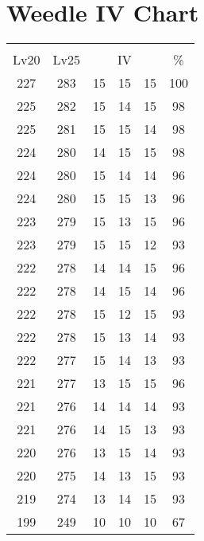 \documentclass{article}%
\begin{document}
%
\normalsize%
\section{Weedle IV Chart}%
\label{sec:Weedle IV Chart}%
\renewcommand{\arraystretch}{1.5}%
\begin{tabular}{|c|c|c|c|c|c|}%
\hline%
\multicolumn{6}{|c|}{\textcolor{white}{ 
\linebreak{Weedle}
}%
\cellcolor{black}}\\%
\multicolumn{1}{|c}{Lv20}&\multicolumn{1}{c|}{Lv25}&\multicolumn{3}{c|}{IV}&\multicolumn{1}{|c|}{\%}\\%
\hline%
\rowcolor{color100}%
227&283&15&15&15&100\\%
\hline%
\rowcolor{color98}%
225&282&15&14&15&98\\%
\hline%
\rowcolor{color98}%
225&281&15&15&14&98\\%
\hline%
\rowcolor{color98}%
224&280&14&15&15&98\\%
\hline%
\rowcolor{color96}%
224&280&15&14&14&96\\%
\hline%
\rowcolor{color96}%
224&280&15&15&13&96\\%
\hline%
\rowcolor{color96}%
223&279&15&13&15&96\\%
\hline%
\rowcolor{color93}%
223&279&15&15&12&93\\%
\hline%
\rowcolor{color96}%
222&278&14&14&15&96\\%
\hline%
\rowcolor{color96}%
222&278&14&15&14&96\\%
\hline%
\rowcolor{color93}%
222&278&15&12&15&93\\%
\hline%
\rowcolor{color93}%
222&278&15&13&14&93\\%
\hline%
\rowcolor{color93}%
222&277&15&14&13&93\\%
\hline%
\rowcolor{color96}%
221&277&13&15&15&96\\%
\hline%
\rowcolor{color93}%
221&276&14&14&14&93\\%
\hline%
\rowcolor{color93}%
221&276&14&15&13&93\\%
\hline%
\rowcolor{color93}%
220&276&13&15&14&93\\%
\hline%
\rowcolor{color93}%
220&275&14&13&15&93\\%
\hline%
\rowcolor{color93}%
219&274&13&14&15&93\\%
\hline%
\rowcolor{color91}%
199&249&10&10&10&67\\%
\end{tabular}

%
\end{document}
